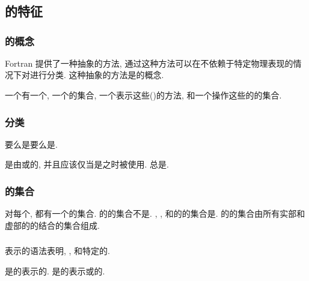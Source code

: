 \chapter{\Type{}}

\section{\Type{}的特征}

\subsection{\Type{}的概念}

Fortran 提供了一种抽象的方法, 通过这种方法可以在不依赖于特定物理表现的情况下对\Data{}进行分类. 这种抽象的方法是\Type{}的概念.

一个\Type{}有一个\Name{}, 一个\Valid{}\Value{}的集合, 一个表示这些\Value{}(\Constant{})的方法, 和一个操作这些\Value{}的\Operation{}的集合.

\subsection{\Type{}分类}

\Type{}要么是\IntrinsicType{}要么是\DerivedType{}.

\DerivedType{}是由\DerivedType{}\Definition{}或\Intrinsic{}\Module{}\Define{}的, 并且应该仅当是\Accessible{}之时被使用. \IntrinsicType{}总是\Accessible{}.

\subsection{\Value{}的集合}

对每个\Type{}, 都有一个\Valid{}\Value{}的集合. \LogicalType{}的\Valid{}\Value{}的集合不是\ProcessorDependent{}. \IntegerType{}, \CharacterType{}, 和\RealType{}的\Valid{}\Value{}的集合是\ProcessorDependent{}. \ComplexType{}的\Valid{}\Value{}的集合由所有实部和虚部的\Value{}的结合的集合组成.

\subsection{\Constant{}}

表示\Value{}的语法表明\Type{}, \TypeParameter{}, 和特定的\Value{}.

是\Constant{}\Expression{}的\StructureConstructor{}表示\DerivedType{}的\Scalar{}\Constant{}\Value{}. 是\Constant{}\Expression{}的\ArrayConstructor{}表示\IntrinsicType{}或\DerivedType{}的\Constant{}\Array{}\Value{}.

